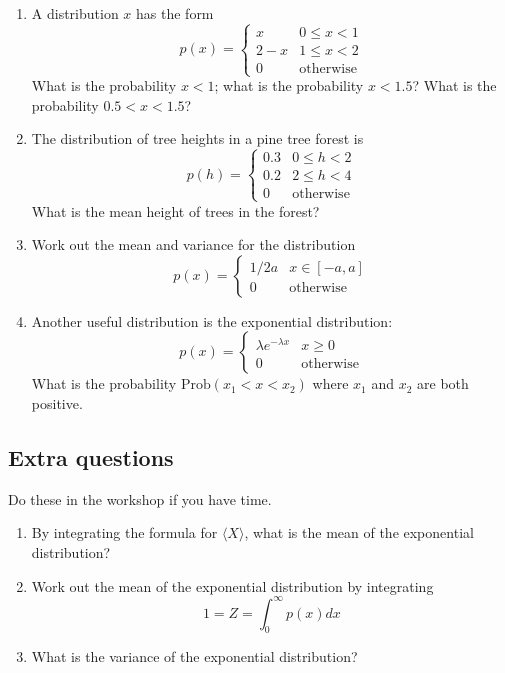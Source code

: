 \documentclass[11pt,a4paper]{scrartcl}
\begin{document}
\begin{enumerate}

\item A distribution $x$ has the form
\begin{equation}
p(x)=\left\{\begin{array}{cc}x& 0\le x <1\\2-x& 1\le x<2\\0&\mbox{otherwise}\end{array}\right.
\end{equation}
What is the probability $x<1$; what is the probability $x<1.5$? What is the probability $0.5<x<1.5$? 
  
\item The distribution of tree heights in a pine tree forest is 
\begin{equation}
p(h)=\left\{\begin{array}{cc}0.3& 0\le h <2\\0.2& 2\le h<4\\0&\mbox{otherwise}\end{array}\right.
\end{equation}
What is the mean height of trees in the forest?

\item Work out the mean and variance for the distribution
  \begin{equation}
    p(x)=\left\{\begin{array}{ll}1/2a&x\in [-a,a]\\0&\mbox{otherwise}\end{array}\right.
  \end{equation}

\item Another useful distribution is the exponential distribution:
$$
p(x)=\left\{\begin{array}{cc}\lambda e^{-\lambda x}& x\ge 0\\ 0&\mbox{otherwise}\end{array}\right.
$$
What is the probability $\mbox{Prob}(x_1 < x <x_2)$ where $x_1$ and $x_2$ are both positive.

\end{enumerate}

\subsection*{Extra questions}

Do these in the workshop if you have time.

\begin{enumerate}

\item By integrating the formula for $\langle X\rangle$, what is the mean of the exponential distribution? 

\item Work out the mean of the exponential distribution by integrating
  $$1=Z=\int_0^{\infty} p(x)dx$$

\item What is the variance of the exponential distribution?
  
\end{enumerate}
\end{document}
